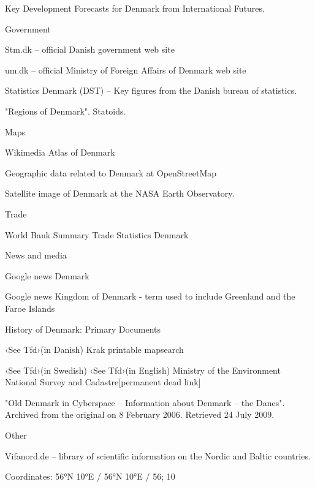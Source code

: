 Key Development Forecasts for Denmark from International Futures.

Government

Stm.dk -- official Danish government web site

um.dk -- official Ministry of Foreign Affairs of Denmark web site

Statistics Denmark (DST) -- Key figures from the Danish bureau of
statistics.

"Regions of Denmark". Statoids.

Maps

Wikimedia Atlas of Denmark

Geographic data related to Denmark at OpenStreetMap

Satellite image of Denmark at the NASA Earth Observatory.

Trade

World Bank Summary Trade Statistics Denmark

News and media

Google news Denmark

Google news Kingdom of Denmark - term used to include Greenland and the
Faroe Islands

History of Denmark: Primary Documents

‹See Tfd›(in Danish) Krak printable mapsearch

‹See Tfd›(in Swedish) ‹See Tfd›(in English) Ministry of the Environment
National Survey and Cadastre{[}permanent dead link{]}

"Old Denmark in Cyberspace -- Information about Denmark -- the Danes".
Archived from the original on 8 February 2006. Retrieved 24 July 2009.

Other

Vifanord.de -- library of scientific information on the Nordic and
Baltic countries.

Coordinates: 56°N 10°E﻿ / ﻿56°N 10°E﻿ / 56; 10
